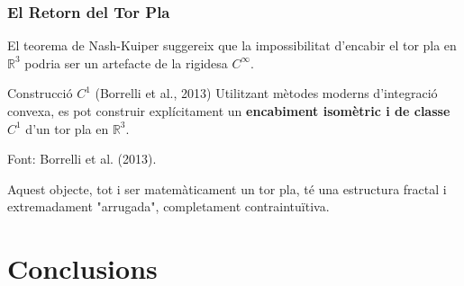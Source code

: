 \documentclass{beamer}
\begin{document}
\begin{frame}
  \frametitle{El Retorn del Tor Pla}
  
  El teorema de Nash-Kuiper suggereix que la impossibilitat d'encabir el tor pla en $\mathbb{R}^3$ podria ser un artefacte de la rigidesa $C^\infty$.
  
  \vspace{1em}
  
  \begin{block}{Construcció $C^1$ (Borrelli et al., 2013)}
    Utilitzant mètodes moderns d'integració convexa, es pot construir explícitament un \textbf{encabiment isomètric i de classe $C^1$} d'un tor pla en $\mathbb{R}^3$. 
  \end{block}
  
  \begin{center}
    \tiny{Font: Borrelli et al. (2013). }
  \end{center}
  
  Aquest objecte, tot i ser matemàticament un tor pla, té una estructura fractal i extremadament "arrugada", completament contraintuïtiva. 
\end{frame}

\section{Conclusions}
\end{document}
